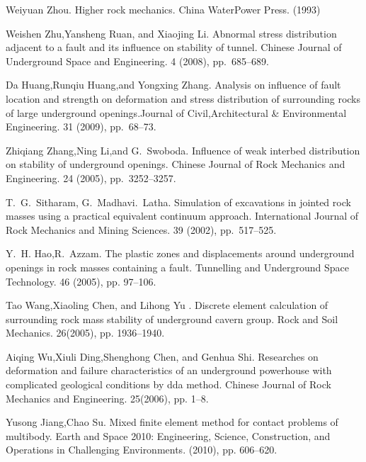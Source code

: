 
\begin{thebibliography}{10}
{\sc Weiyuan Zhou}. {Higher rock mechanics}. China WaterPower Press.  (1993) 

{\sc Weishen Zhu,Yansheng Ruan, and Xiaojing Li}. {Abnormal stress distribution adjacent to a fault and its influence on stability of tunnel}. Chinese Journal of Underground Space and Engineering. 4 (2008), pp.~685--689.

{\sc Da Huang,Runqiu Huang,and Yongxing Zhang}. {Analysis on influence of fault location and strength on deformation and stress distribution of surrounding rocks of large underground openings}.Journal of Civil,Architectural \& Environmental Engineering. 31 (2009), pp.~68--73.

{\sc Zhiqiang Zhang,Ning Li,and G.~Swoboda}. {Influence of weak interbed distribution on stability of underground openings}.  Chinese Journal of Rock Mechanics and Engineering. 24 (2005), pp.~3252--3257.

{\sc T.~G.~Sitharam, G.~Madhavi.~Latha}. {Simulation of excavations in jointed rock masses using a practical equivalent continuum approach}. International Journal of Rock Mechanics and Mining Sciences. 39 (2002), pp.~517--525.

{\sc Y.~H. Hao,R.~Azzam}.
\newblock The plastic zones and displacements around underground openings in rock masses containing a fault.
\newblock Tunnelling and Underground Space Technology. 46 (2005), pp. 97--106.

{\sc Tao Wang,Xiaoling Chen, and Lihong Yu }.
\newblock Discrete element calculation of surrounding rock mass stability of underground cavern group.
\newblock Rock and Soil Mechanics. 26(2005), pp. 1936--1940.

{\sc Aiqing Wu,Xiuli Ding,Shenghong Chen, and Genhua Shi}.
\newblock Researches on deformation and failure characteristics of an underground powerhouse with complicated geological conditions by dda method.
\newblock Chinese Journal of Rock Mechanics and Engineering. 25(2006), pp. 1--8.

{\sc Yusong Jiang,Chao Su}.
\newblock Mixed finite element method for contact problems of multibody.
\newblock Earth and Space 2010: Engineering, Science, Construction, and Operations in Challenging Environments. (2010), pp. 606--620.
\end{thebibliography}
